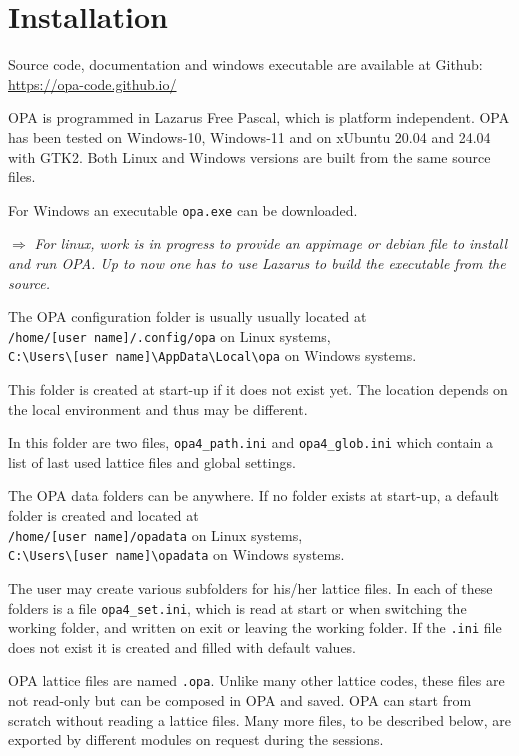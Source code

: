 \documentclass[12pt]{article}
\newcommand\todo[1]{$\Longrightarrow$ {\em #1} }
\newcommand\code[1]{{\tt #1}}
\begin{document}
\section{Installation}
Source code, documentation and windows executable are available at Github: \url{https://opa-code.github.io/}

OPA is programmed in Lazarus Free Pascal, which is platform independent. OPA has been tested on Windows-10, Windows-11 and on xUbuntu 20.04 and 24.04 with GTK2. Both Linux and Windows versions are built from the same source files.

For Windows an executable {\tt opa.exe} can be downloaded. 

\todo{For linux, work is in progress to provide an appimage or debian file to install and run OPA. Up to now one has to use Lazarus to build the executable from the source.}

The OPA configuration folder is usually  usually located at \\
\code{/home/[user~name]/.config/opa} on Linux systems,  \\
\code{C:\textbackslash Users\textbackslash [user~name]\textbackslash AppData\textbackslash Local\textbackslash opa} on Windows systems.

This folder is created at start-up if it does not exist yet. The location depends on the local environment and thus may be different.

In this folder are two files, \code{opa4\_path.ini} and \code{opa4\_glob.ini} which contain a list of last used lattice files and global settings.

The OPA data folders can be anywhere. If no folder exists at start-up, a default folder is created and located at \\
\code{/home/[user~name]/opadata} on Linux systems,  \\
\code{C:\textbackslash Users\textbackslash [user~name]\textbackslash opadata} on Windows systems.

The user may create various subfolders for his/her lattice files.
In each of these folders is a file \code{opa4\_set.ini}, which is read at start or when switching the working folder, and written on exit or leaving the working folder. If the \code{.ini} file does not exist it is created and filled with default values. 

OPA lattice files are named {\tt *.opa}. Unlike many other lattice codes, these files are not read-only but can be composed in OPA and saved. OPA can start from scratch without reading a lattice files.
Many more files, to be described below, are exported by different modules on request during the sessions. 
\end{document}

